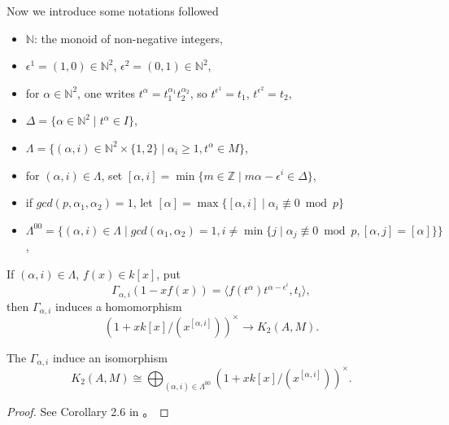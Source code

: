 Now we introduce some notations followed \cite{MR86f:18017}
\begin{itemize}
	\item $\mathbb{N}$: the monoid of non-negative integers, 
	\item $\epsilon^1 = (1,0)\in \mathbb{N}^2$, $\epsilon^2 = (0,1)\in \mathbb{N}^2$,
	\item for $\alpha \in \mathbb{N}^2$, one writes $t^{\alpha}=t_1^{\alpha_1}t_2^{\alpha_2}$, so $t^{\epsilon^1}=t_1$, $t^{\epsilon^2}=t_2$,
	\item $\Delta=\{\alpha\in\mathbb{N}^2\mid  t^{\alpha}\in I\}$,
	\item $\Lambda=\{(\alpha,i)\in\mathbb{N}^2 \times \{1,2\}\mid  \alpha_i\geq 1, t^{\alpha}\in M\}$,
	\item for $(\alpha,i)\in\Lambda$, set $[\alpha,i]=\min\{m\in \mathbb{Z}\mid m\alpha - \epsilon^i\in \Delta\}$,
	\item if $gcd(p,\alpha_1,\alpha_2)=1$, let $[\alpha]=\max\{[\alpha,i]\mid  \alpha_i  \not\equiv 0 \bmod p\}$
	\item $\Lambda^{00}= \big\{(\alpha,i)\in \Lambda\mid  gcd(\alpha_1,\alpha_2)=1, i\neq \min\{j\mid \alpha_j\not\equiv 0 \bmod p, [\alpha,j]=[\alpha]\} \big\}$,
\end{itemize}

If $(\alpha,i)\in \Lambda$, $f(x)\in k[x]$, put
\[\Gamma_{\alpha,i}(1-xf(x))= \langle f(t^\alpha)t^{\alpha-\epsilon^i},t_i \rangle,\]
then $\Gamma_{\alpha,i}$ induces a homomorphism
\[(1+xk[x]/(x^{[\alpha,i]}))^{\times} \longrightarrow K_2(A,M).\]
\begin{lemma}
\label{K2(A,M)}
	The $\Gamma_{\alpha,i}$ induce an isomorphism
\[ K_2(A,M)\cong \bigoplus_{(\alpha,i)\in\Lambda^{00}}(1+xk[x]/(x^{[\alpha,i]}))^{\times}.\]
\end{lemma}
\begin{proof}
	See Corollary 2.6 in \cite{MR86f:18017}。
\end{proof}

